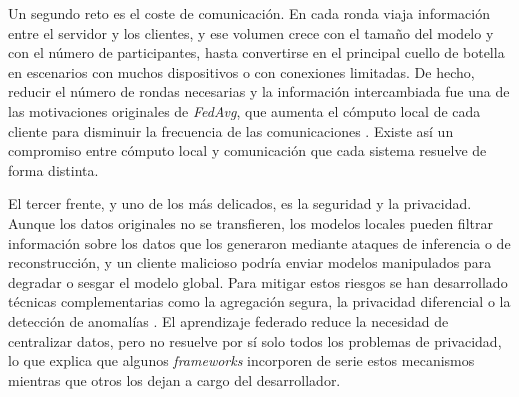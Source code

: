 Un segundo reto es el coste de comunicación. En cada ronda viaja información entre el
servidor y los clientes, y ese volumen crece con el tamaño del modelo y con el número de
participantes, hasta convertirse en el principal cuello de botella en escenarios con
muchos dispositivos o con conexiones limitadas. De hecho, reducir el número de rondas
necesarias y la información intercambiada fue una de las motivaciones originales de
\textit{FedAvg}, que aumenta el cómputo local de cada cliente para disminuir la frecuencia
de las comunicaciones \parencite{mcmahan2017communication,li2020federated}. Existe así un
compromiso entre cómputo local y comunicación que cada sistema resuelve de forma distinta.

El tercer frente, y uno de los más delicados, es la seguridad y la privacidad. Aunque los
datos originales no se transfieren, los modelos locales pueden filtrar información sobre
los datos que los generaron mediante ataques de inferencia o de reconstrucción, y un
cliente malicioso podría enviar modelos manipulados para degradar o sesgar el modelo
global. Para mitigar estos riesgos se han desarrollado técnicas complementarias como la
agregación segura, la privacidad diferencial o la detección de anomalías
\parencite{kairouz2021advances,bonawitz2019towards}. El aprendizaje federado
reduce la necesidad de centralizar datos, pero no resuelve por sí solo todos los
problemas de privacidad, lo que explica que algunos \textit{frameworks} incorporen de
serie estos mecanismos mientras que otros los dejan a cargo del desarrollador.


